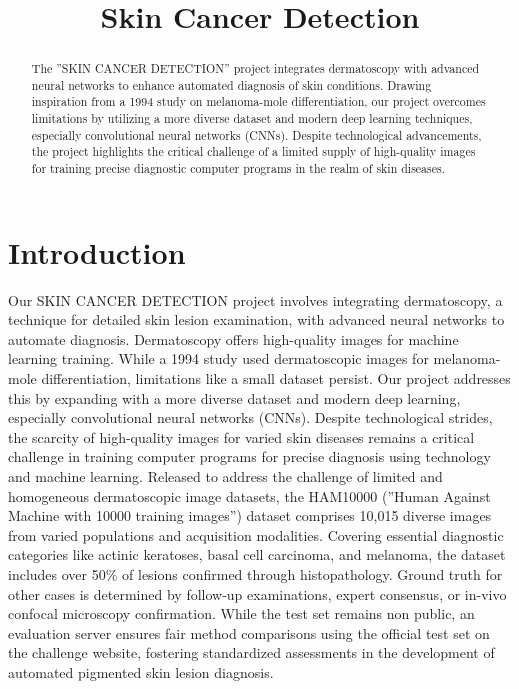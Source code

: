\documentclass[conference]{IEEEtran}
\begin{document}
\title{Skin Cancer Detection\\
}

\author{
}

\maketitle

\begin{abstract}
The ”SKIN CANCER DETECTION” project integrates dermatoscopy with advanced neural networks to enhance automated diagnosis of skin conditions. Drawing inspiration from a 1994 study on melanoma-mole differentiation, our project overcomes limitations by utilizing a more diverse dataset and modern deep learning techniques, especially convolutional neural networks (CNNs). Despite technological advancements, the project highlights the critical challenge of a limited supply of high-quality images for training precise diagnostic computer programs in the realm of skin diseases.
\end{abstract}



\section{Introduction}
Our SKIN CANCER DETECTION project involves integrating dermatoscopy, a technique for detailed skin lesion examination, with advanced neural networks to automate diagnosis. Dermatoscopy offers high-quality images for machine learning training. While a 1994 study used dermatoscopic images for melanoma-mole differentiation, limitations like a
small dataset persist. Our project addresses this by expanding with a more diverse dataset and modern deep learning,
especially convolutional neural networks (CNNs). Despite
technological strides, the scarcity of high-quality images for
varied skin diseases remains a critical challenge in training
computer programs for precise diagnosis using technology and
machine learning.
Released to address the challenge of limited and homogeneous dermatoscopic image datasets, the HAM10000 (”Human
Against Machine with 10000 training images”) dataset comprises 10,015 diverse images from varied populations and acquisition modalities. Covering essential diagnostic categories
like actinic keratoses, basal cell carcinoma, and melanoma,
the dataset includes over 50\% of lesions confirmed through
histopathology. Ground truth for other cases is determined by
follow-up examinations, expert consensus, or in-vivo confocal
microscopy confirmation. While the test set remains non public, an evaluation server ensures fair method comparisons
using the official test set on the challenge website, fostering
standardized assessments in the development of automated
pigmented skin lesion diagnosis.
\end{document}
